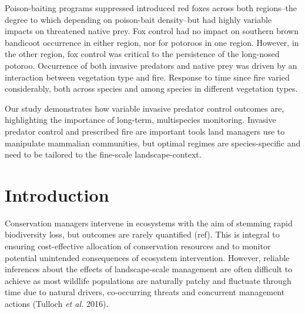 \documentclass[11pt,a4paper,titlepage,twoside,openright]{style/unimelbthesis}
\begin{document}
\begin{mainmatter}
Poison-baiting programs suppressed introduced red foxes across both regions--the degree to which depending on poison-bait density--but had highly variable impacts on threatened native prey. Fox control had no impact on southern brown bandicoot occurrence in either region, nor for potoroos in one region. However, in the other region, fox control was critical to the persistence of the long-nosed potoroo. Occurrence of both invasive predators and native prey was driven by an interaction between vegetation type and fire. Response to time since fire varied considerably, both across species and among species in different vegetation types.

Our study demonstrates how variable invasive predator control outcomes are, highlighting the importance of long-term, multispecies monitoring. Invasive predator control and prescribed fire are important tools land managers use to manipulate mammalian communities, but optimal regimes are species-specific and need to be tailored to the fine-scale landscape-context.

\newpage

\hypertarget{introduction-1}{%
\section{Introduction}\label{introduction-1}}

Conservation managers intervene in ecosystems with the aim of stemming rapid biodiversity loss, but outcomes are rarely quantified (ref). This is integral to ensuring cost-effective allocation of conservation resources and to monitor potential unintended consequences of ecosystem intervention. However, reliable inferences about the effects of landscape-scale management are often difficult to achieve as most wildlife populations are naturally patchy and fluctuate through time due to natural drivers, co-occurring threats and concurrent management actions (Tulloch \emph{et al.} 2016).


\end{mainmatter}
\end{document}
